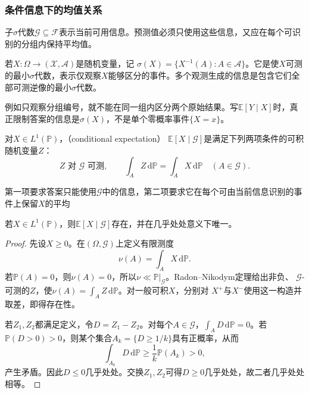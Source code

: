 \subsubsection{条件信息下的均值关系}
\label{sec:rv-conditional-expectation}
子\(\sigma\)代数\(\mathcal{G}\subseteq\mathcal{F}\)表示当前可用信息。预测值必须只使用这些信息，又应在每个可识别的分组内保持平均值。
\begin{definition}[观测生成的信息]
  \label{def:probability-generated-information}
若\(X:\Omega\to(\mathcal X,\mathcal A)\)是随机变量，记
\(\sigma(X)=\{X^{-1}(A):A\in\mathcal A\}\)。它是使\(X\)可测的最小\(\sigma\)代数，表示仅观察\(X\)能够区分的事件。多个观测生成的信息是包含它们全部可测逆像的最小\(\sigma\)代数。
\end{definition}
例如只观察分组编号，就不能在同一组内区分两个原始结果。写\(\mathbb E[Y\mid X]\)时，真正限制答案的信息是\(\sigma(X)\)，不是单个零概率事件\(\{X=x\}\)。
\begin{definition}[条件期望]
  \label{def:probability-conditional-expectation}
对\(X\in L^1(\mathbb P)\)，（conditional expectation）
\(\mathbb{E}[X\mid\mathcal{G}]\)是满足下列两项条件的可积随机变量\(Z\)：
\[ Z\text{ 对 }\mathcal{G}\text{ 可测},
  \qquad\int_A Z\,\mathrm{d}\mathbb{P}=\int_A X\,\mathrm{d}\mathbb{P}\quad(A\in\mathcal{G}). \]
\end{definition}
第一项要求答案只能使用\(\mathcal{G}\)中的信息，第二项要求它在每个可由当前信息识别的事件上保留\(X\)的平均

\begin{theorem}[条件期望的存在与唯一性]
\label{thm:probability-conditional-expectation-existence}
若\(X\in L^1(\mathbb{P})\)，则\(\mathbb{E}[X\mid\mathcal{G}]\)存在，并在几乎处处意义下唯一。
\end{theorem}

\begin{proof}
先设\(X\geq0\)。在\((\Omega,\mathcal{G})\)上定义有限测度
\[ \nu(A)=\int_A X\,\mathrm{d}\mathbb{P}. \]
若\(\mathbb{P}(A)=0\)，则\(\nu(A)=0\)，所以\(\nu\ll\mathbb{P}|_{\mathcal{G}}\)。Radon--Nikodym定理给出非负、
\(\mathcal{G}\)-可测的\(Z\)，使\(\nu(A)=\int_A Z\,\mathrm{d}\mathbb{P}\)。对一般可积\(X\)，分别对
\(X^+\)与\(X^-\)使用这一构造并取差，即得存在性。

若\(Z_1,Z_2\)都满足定义，令\(D=Z_1-Z_2\)。对每个\(A\in\mathcal{G}\)，\(\int_A D\,\mathrm{d}\mathbb{P}=0\)。若
\(\mathbb{P}(D>0)>0\)，则某个集合\(A_k=\{D\geq1/k\}\)具有正概率，从而
\[ \int_{A_k}D\,\mathrm{d}\mathbb{P}
  \geq\frac{1}{k}\mathbb{P}(A_k)>0, \]
产生矛盾。因此\(D\leq0\)几乎处处。交换\(Z_1,Z_2\)可得\(D\geq0\)几乎处处，故二者几乎处处相等。
\end{proof}

